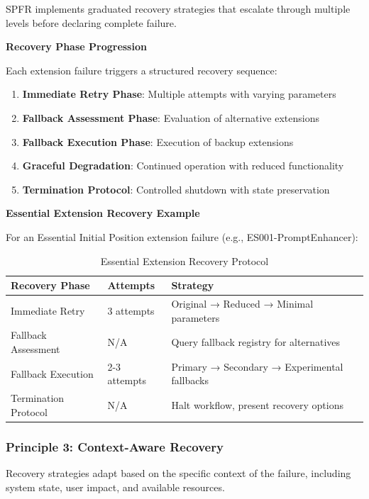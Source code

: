 SPFR implements graduated recovery strategies that escalate through multiple levels before declaring complete failure.

\textbf{Recovery Phase Progression}

Each extension failure triggers a structured recovery sequence:

\begin{enumerate}
    \item \textbf{Immediate Retry Phase}: Multiple attempts with varying parameters
    \item \textbf{Fallback Assessment Phase}: Evaluation of alternative extensions
    \item \textbf{Fallback Execution Phase}: Execution of backup extensions
    \item \textbf{Graceful Degradation}: Continued operation with reduced functionality
    \item \textbf{Termination Protocol}: Controlled shutdown with state preservation
\end{enumerate}

\textbf{Essential Extension Recovery Example}

For an Essential Initial Position extension failure (e.g., ES001-PromptEnhancer):

\begin{table}[h]
\centering
\caption{Essential Extension Recovery Protocol}
\label{tab:essential-recovery}
\begin{tabular}{@{}lll@{}}
\toprule
\textbf{Recovery Phase} & \textbf{Attempts} & \textbf{Strategy} \\
\midrule
Immediate Retry & 3 attempts & Original → Reduced → Minimal parameters \\
Fallback Assessment & N/A & Query fallback registry for alternatives \\
Fallback Execution & 2-3 attempts & Primary → Secondary → Experimental fallbacks \\
Termination Protocol & N/A & Halt workflow, present recovery options \\
\bottomrule
\end{tabular}
\end{table}

\subsubsection{Principle 3: Context-Aware Recovery}

Recovery strategies adapt based on the specific context of the failure, including system state, user impact, and available resources.

